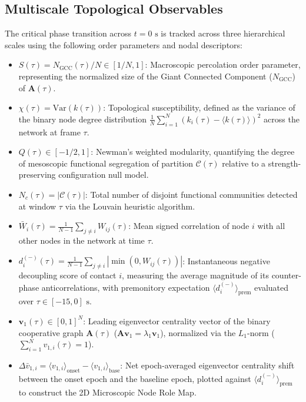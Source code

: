 \subsection{Multiscale Topological Observables}
The critical phase transition across $t = 0\text{ s}$ is tracked across three hierarchical scales using the following order parameters and nodal descriptors:

\begin{itemize}
    \item $S(\tau) = N_{\text{GCC}}(\tau)/N \in [1/N, 1]$: Macroscopic percolation order parameter, representing the normalized size of the Giant Connected Component ($N_{\text{GCC}}$) of $\mathbf{A}(\tau)$.
    \item $\chi(\tau) = \text{Var}(k(\tau))$: Topological susceptibility, defined as the variance of the binary node degree distribution $\frac{1}{N}\sum_{i=1}^N (k_i(\tau) - \langle k(\tau) \rangle)^2$ across the network at frame $\tau$.
    \item $Q(\tau) \in [-1/2, 1]$: Newman's weighted modularity, quantifying the degree of mesoscopic functional segregation of partition $\mathcal{C}(\tau)$ relative to a strength-preserving configuration null model.
    \item $N_c(\tau) = |\mathcal{C}(\tau)|$: Total number of disjoint functional communities detected at window $\tau$ via the Louvain heuristic algorithm.
    \item $\bar{W}_i(\tau) = \frac{1}{N-1}\sum_{j \neq i} W_{ij}(\tau)$: Mean signed correlation of node $i$ with all other nodes in the network at time $\tau$.
    \item $d_i^{(-)}(\tau) = \frac{1}{N-1}\sum_{j \neq i} |\min(0, W_{ij}(\tau))|$: Instantaneous negative decoupling score of contact $i$, measuring the average magnitude of its counter-phase anticorrelations, with premonitory expectation $\langle d_i^{(-)} \rangle_{\text{prem}}$ evaluated over $\tau \in [-15, 0]\text{ s}$.
    \item $\mathbf{v}_1(\tau) \in [0, 1]^N$: Leading eigenvector centrality vector of the binary cooperative graph $\mathbf{A}(\tau)$ ($\mathbf{A}\mathbf{v}_1 = \lambda_1 \mathbf{v}_1$), normalized via the $L_1$-norm ($\sum_{i=1}^N v_{1,i}(\tau) = 1$).
    \item $\Delta \bar{v}_{1,i} = \langle v_{1,i} \rangle_{\text{onset}} - \langle v_{1,i} \rangle_{\text{base}}$: Net epoch-averaged eigenvector centrality shift between the onset epoch and the baseline epoch, plotted against $\langle d_i^{(-)} \rangle_{\text{prem}}$ to construct the 2D Microscopic Node Role Map.
\end{itemize}